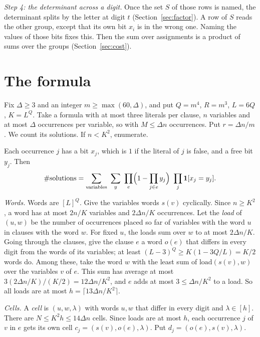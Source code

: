\documentclass[11pt]{article}
\numberwithin{equation}{section}
\theoremstyle{remark}
\begin{document}
\emph{Step 4: the determinant across a digit.} Once the set $S$ of those rows is named, the determinant splits by the letter at digit $t$ (Section~\ref{sec:factor}). A row of $S$ reads the other group, except that its own bit $x_i$ is in the wrong one. Naming the values of those bits fixes this. Then the sum over assignments is a product of sums over the groups (Section~\ref{sec:cost}).

\section{The formula}\label{sec:formula}

Fix $\Delta\ge3$ and an integer $m\ge\max(60,\Delta)$, and put $Q=m^4$, $R=m^3$, $L=6Q$, $K=L^Q$. Take a formula with at most three literals per clause, $n$ variables and at most $\Delta$ occurrences per variable, so with $M\le\Delta n$ occurrences. Put $r=\Delta n/m$. We count its solutions. If $n<K^2$, enumerate.

Each occurrence $j$ has a bit $x_j$, which is $1$ if the literal of $j$ is false, and a free bit $y_j$. Then
\begin{equation}\label{count}
\#\text{solutions}=\sum_{\text{variables}}\ \sum_{y}\ \prod_e\Bigl(1-\prod_{j\in e}y_j\Bigr)\ \prod_j\mathbf 1[x_j=y_j].
\end{equation}

\emph{Words.} Words are $[L]^Q$. Give the variables words $s(v)$ cyclically. Since $n\ge K^2$, a word has at most $2n/K$ variables and $2\Delta n/K$ occurrences. Let the \emph{load} of $(u,w)$ be the number of occurrences placed so far of variables with the word $u$ in clauses with the word $w$. For fixed $u$, the loads sum over $w$ to at most $2\Delta n/K$. Going through the clauses, give the clause $e$ a word $o(e)$ that differs in every digit from the words of its variables; at least $(L-3)^Q\ge K(1-3Q/L)=K/2$ words do. Among these, take the word $w$ with the least sum of $\mathrm{load}(s(v),w)$ over the variables $v$ of $e$. This sum has average at most $3(2\Delta n/K)/(K/2)=12\Delta n/K^2$, and $e$ adds at most $3\le\Delta n/K^2$ to a load. So all loads are at most $h=\lceil13\Delta n/K^2\rceil$.

\emph{Cells.} A \emph{cell} is $(u,w,\lambda)$ with words $u,w$ that differ in every digit and $\lambda\in[h]$. There are $N\le K^2h\le14\Delta n$ cells. Since loads are at most $h$, each occurrence $j$ of $v$ in $e$ gets its own cell $c_j=(s(v),o(e),\lambda)$. Put $d_j=(o(e),s(v),\lambda)$.
\end{document}
